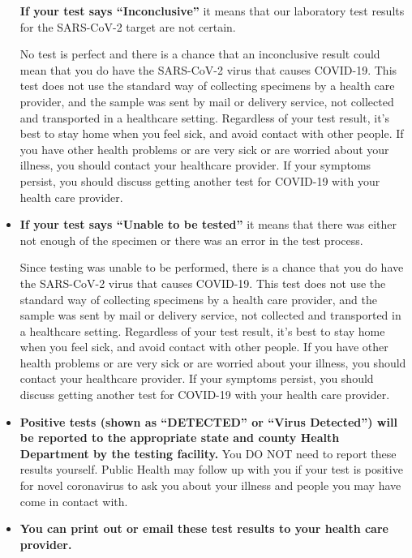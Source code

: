 \documentclass[10pt]{article}
\begin{document}
\begin{itemize}
  \textbf{If your test says ``Inconclusive''} it means that our
  laboratory test results for the SARS-CoV-2 target are not certain.

  No test is perfect and there is a chance that an inconclusive result
  could mean that you do have the SARS-CoV-2 virus that causes COVID-19.
  This test does not use the standard way of collecting specimens by a
  health care provider, and the sample was sent by mail or delivery service, not collected and
  transported in a healthcare setting. Regardless of your test result,
  it's best to stay home when you feel sick, and avoid contact with other
  people. If you have other health problems or are very sick or are
  worried about your illness, you should contact your healthcare provider.
  If your symptoms persist, you should discuss getting another test for
  COVID-19 with your health care provider.

\item

  \textbf{If your test says ``Unable to be tested''} it means that there
  was either not enough of the specimen or there was an error in the
  test process.

  Since testing was unable to be performed, there is a chance that you do
  have the SARS-CoV-2 virus that causes COVID-19. This test does not use
  the standard way of collecting specimens by a health care provider, and
  the sample was sent by mail or delivery service, not collected and transported in a
  healthcare setting. Regardless of your test result, it's best to stay
  home when you feel sick, and avoid contact with other people. If you
  have other health problems or are very sick or are worried about your
  illness, you should contact your healthcare provider. If your symptoms
  persist, you should discuss getting another test for COVID-19 with your
  health care provider.

\item

  \textbf{Positive tests (shown as ``DETECTED'' or ``Virus Detected'')
  will be reported to the appropriate state and county Health Department
  by the testing facility.} You DO NOT need to report these results
  yourself. Public Health may follow up with you if your test is
  positive for novel coronavirus to ask you about your illness and
  people you may have come in contact with.

\item

  \textbf{You can print out or email these test results to your health
  care provider.}

\end{itemize}
\end{document}
